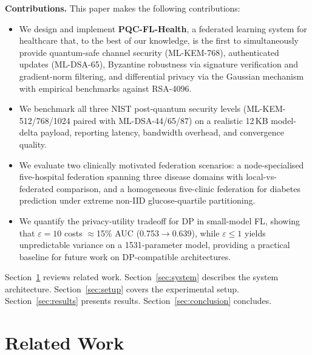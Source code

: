 \documentclass[runningheads]{llncs}
\begin{document}
\textbf{Contributions.} This paper makes the following contributions:
\begin{itemize}
  \item We design and implement \textbf{PQC-FL-Health}, a federated
    learning system for healthcare that, to the best of our knowledge,
    is the first to simultaneously provide quantum-safe channel security
    (ML-KEM-768), authenticated updates (ML-DSA-65), Byzantine
    robustness via signature verification and gradient-norm filtering,
    and differential privacy via the Gaussian mechanism with empirical
    benchmarks against RSA-4096.

  \item We benchmark all three NIST post-quantum security levels
    (ML-KEM-512/768/1024 paired with ML-DSA-44/65/87) on a realistic
    12\,KB model-delta payload, reporting latency, bandwidth overhead,
    and convergence quality.

  \item We evaluate two clinically motivated federation scenarios:
    a node-specialised five-hospital federation spanning three disease
    domains with local-vs-federated comparison, and a homogeneous
    five-clinic federation for diabetes prediction under extreme
    non-IID glucose-quartile partitioning.

  \item We quantify the privacy-utility tradeoff for DP in small-model
    FL, showing that $\varepsilon = 10$ costs $\approx$15\% AUC
    (0.753$\to$0.639), while $\varepsilon \le 1$ yields unpredictable
    variance on a 1531-parameter model, providing a practical baseline
    for future work on DP-compatible architectures.
\end{itemize}

Section~\ref{sec:related} reviews related work.
Section~\ref{sec:system} describes the system architecture.
Section~\ref{sec:setup} covers the experimental setup.
Section~\ref{sec:results} presents results.
Section~\ref{sec:conclusion} concludes.

\section{Related Work}
\label{sec:related}
\end{document}
